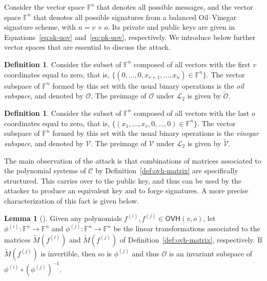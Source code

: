 \documentclass[12pt, a4paper, oneside]{memoir}
\theoremstyle{definition}
\newtheorem{definition}[theorem]{Definition}
\newtheorem{lemma}[theorem]{Lemma}
\begin{document}
Consider the vector space $\mathbb{F}^{o}$ that denotes all possible messages, and the vector space $\mathbb{F}^{n}$ that denotes all possible signatures from a balanced Oil--Vinegar signature scheme, with $n = v + o$. Its private and public keys are given in Equations~\ref{eq:sk-uov} and~\ref{eq:pk-uov}, respectively. We introduce below further vector spaces that are essential to discuss the attack.

\begin{definition}\label{def:oil-subspace}
  Consider the subset of $\mathbb{F}^{n}$ composed of all vectors with the first $v$ coordinates equal to zero, that is, $\{ (0, \dots, 0, x_{v + 1}, \dots, x_{n}) \in \mathbb{F}^{n} \}$. The vector subspace of $\mathbb{F}^{n}$ formed by this set with the usual binary operations is the \emph{oil subspace}, and denoted by $\mathcal{O}$. The preimage of $\mathcal{O}$ under $\mathcal{L}_{2}$ is given by $\widetilde{\mathcal{O}}$.
\end{definition}

\begin{definition}
  Consider the subset of $\mathbb{F}^{n}$ composed of all vectors with the last $o$ coordinates equal to zero, that is, $\{ (x_{1}, \dots, x_{v}, 0, \dots, 0) \in \mathbb{F}^{n} \}$. The vector subspace of $\mathbb{F}^{n}$ formed by this set with the usual binary operations is the \emph{vinegar subspace}, and denoted by $\mathcal{V}$. The preimage of $\mathcal{V}$ under $\mathcal{L}_{2}$ is given by $\widetilde{\mathcal{V}}$.
\end{definition}

The main observation of the attack is that combinations of matrices associated to the polynomial systems of $\mathcal{C}$ by Definition~\ref{def:ovh-matrix} are specifically structured. This carries over to the public key, and thus can be used by the attacker to produce an equivalent key and to forge signatures. A more precise characterization of this fact is given below.

\begin{lemma}[{\cite[Lemma~1]{Kipnis:199904}}]
  Given any polynomials $f^{(i)}, f^{(j)} \in \textsf{OVH}(v, o)$, let $\phi^{(i)} : \mathbb{F}^{n} \to \mathbb{F}^{n}$ and $\phi^{(j)} : \mathbb{F}^{n} \to \mathbb{F}^{n}$ be the linear transformations associated to the matrices $\widetilde{M}(f^{(i)})$ and $\widetilde{M}(f^{(j)})$ of Definition~\ref{def:ovh-matrix}, respectively. If $\widetilde{M}(f^{(j)})$ is invertible, then so is $\phi^{(j)}$ and thus $\mathcal{O}$ is an invariant subspace of $\phi^{(i)} \circ (\phi^{(j)})^{-1}$.
\end{lemma}
\end{document}
